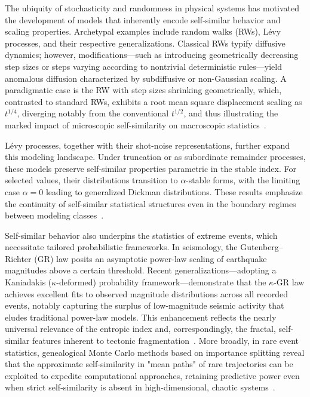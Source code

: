 \documentclass[sigconf]{acmart}
\begin{document}
The ubiquity of stochasticity and randomness in physical systems has motivated the development of models that inherently encode self-similar behavior and scaling properties. Archetypal examples include random walks (RWs), Lévy processes, and their respective generalizations. Classical RWs typify diffusive dynamics; however, modifications—such as introducing geometrically decreasing step sizes or steps varying according to nontrivial deterministic rules—yield anomalous diffusion characterized by subdiffusive or non-Gaussian scaling. A paradigmatic case is the RW with step sizes shrinking geometrically, which, contrasted to standard RWs, exhibits a root mean square displacement scaling as $t^{1/4}$, diverging notably from the conventional $t^{1/2}$, and thus illustrating the marked impact of microscopic self-similarity on macroscopic statistics~\cite{ref57}.

Lévy processes, together with their shot-noise representations, further expand this modeling landscape. Under truncation or as subordinate remainder processes, these models preserve self-similar properties parametric in the stable index. For selected values, their distributions transition to $\alpha$-stable forms, with the limiting case $\alpha = 0$ leading to generalized Dickman distributions. These results emphasize the continuity of self-similar statistical structures even in the boundary regimes between modeling classes~\cite{ref62}.

Self-similar behavior also underpins the statistics of extreme events, which necessitate tailored probabilistic frameworks. In seismology, the Gutenberg–Richter (GR) law posits an asymptotic power-law scaling of earthquake magnitudes above a certain threshold. Recent generalizations—adopting a Kaniadakis ($\kappa$-deformed) probability framework—demonstrate that the $\kappa$-GR law achieves excellent fits to observed magnitude distributions across all recorded events, notably capturing the surplus of low-magnitude seismic activity that eludes traditional power-law models. This enhancement reflects the nearly universal relevance of the entropic index and, correspondingly, the fractal, self-similar features inherent to tectonic fragmentation~\cite{ref58}. More broadly, in rare event statistics, genealogical Monte Carlo methods based on importance splitting reveal that the approximate self-similarity in "mean paths" of rare trajectories can be exploited to expedite computational approaches, retaining predictive power even when strict self-similarity is absent in high-dimensional, chaotic systems~\cite{ref59}.
\end{document}
